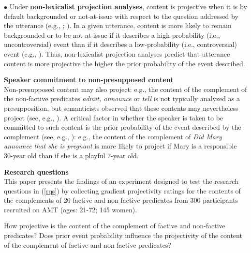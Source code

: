 \documentclass[12pt,fleqn]{article}
\newcommand{\6}{\mbox{$[\hspace*{-.6mm}[$}}
\newcommand{\9}{\mbox{$]\hspace*{-.6mm}]$}}
\begin{document}
\noindent
{\bf $\bullet$} Under {\bf non-lexicalist projection analyses}, content is projective when it is by default backgrounded or not-at-issue with respect to the question addressed by the utterance (e.g., \citealt{abrusan2011,abrusan2016,brst-salt10,brst-ar}; \citealt*{tbd-variability}). In a given utterance,  content is more likely to remain backgrounded or to be not-at-issue if it describes a high-probability (i.e., uncontroversial) event than if it describes a low-probability (i.e., controversial) event (e.g., \citealt[252]{simons2003}). Thus, non-lexicalist projection analyses predict that utterance content is more projective the higher the prior probability of the event described. 

\noindent
{\bf Speaker commitment to non-presupposed content} 
\\ Non-presupposed content may also project: e.g., the content of the complement of the non-factive predicates {\em admit, announce} or {\em tell} is not typically analyzed as a presupposition, but semanticists observed that these contents may nevertheless project (see, e.g., \citealt{schlenker10,anand-hacquard2014,spector-egre2015}). A critical factor in whether the speaker is taken to be committed to such content is the prior probability of the event described by the complement (see, e.g., \citealt{schlenker10}): e.g., the content of the complement of {\em Did Mary announce that she is pregnant} is more likely to project if Mary is a responsible 30-year old than if she is a playful 7-year old. 

\noindent
{\bf Research questions}
\\ This paper presents the findings of an experiment designed to test the research questions in (\ref{rqs}) by collecting gradient projectivity ratings for the contents of the complements of 20 factive and non-factive predicates from 300 participants recruited on AMT (ages: 21-72; 145 women).
\vspace*{-.15cm}
\begin{exe}
\ex\label{rqs}
\begin{xlist}
\ex How projective is the content of the complement of factive and non-factive predicates?
\vspace*{-.1cm}
\ex Does prior event probability influence the projectivity of the content of the complement of factive and non-factive predicates?
\end{xlist}
\end{exe}
\vspace*{-.15cm}
\end{document}
